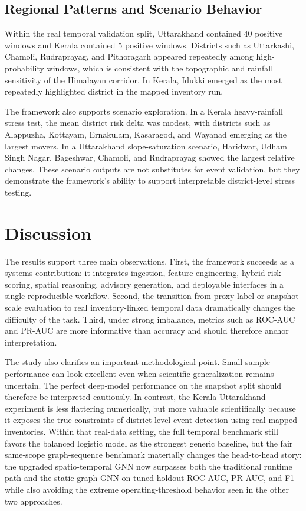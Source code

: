 \documentclass[pdflatex,sn-mathphys-num]{sn-jnl}
\begin{document}
\subsection{Regional Patterns and Scenario Behavior}

Within the real temporal validation split, Uttarakhand contained 40 positive windows and Kerala contained 5 positive windows. Districts such as Uttarkashi, Chamoli, Rudraprayag, and Pithoragarh appeared repeatedly among high-probability windows, which is consistent with the topographic and rainfall sensitivity of the Himalayan corridor. In Kerala, Idukki emerged as the most repeatedly highlighted district in the mapped inventory run.

The framework also supports scenario exploration. In a Kerala heavy-rainfall stress test, the mean district risk delta was modest, with districts such as Alappuzha, Kottayam, Ernakulam, Kasaragod, and Wayanad emerging as the largest movers. In a Uttarakhand slope-saturation scenario, Haridwar, Udham Singh Nagar, Bageshwar, Chamoli, and Rudraprayag showed the largest relative changes. These scenario outputs are not substitutes for event validation, but they demonstrate the framework's ability to support interpretable district-level stress testing.

\section{Discussion}

The results support three main observations. First, the framework succeeds as a systems contribution: it integrates ingestion, feature engineering, hybrid risk scoring, spatial reasoning, advisory generation, and deployable interfaces in a single reproducible workflow. Second, the transition from proxy-label or snapshot-scale evaluation to real inventory-linked temporal data dramatically changes the difficulty of the task. Third, under strong imbalance, metrics such as ROC-AUC and PR-AUC are more informative than accuracy and should therefore anchor interpretation.

The study also clarifies an important methodological point. Small-sample performance can look excellent even when scientific generalization remains uncertain. The perfect deep-model performance on the snapshot split should therefore be interpreted cautiously. In contrast, the Kerala-Uttarakhand experiment is less flattering numerically, but more valuable scientifically because it exposes the true constraints of district-level event detection using real mapped inventories. Within that real-data setting, the full temporal benchmark still favors the balanced logistic model as the strongest generic baseline, but the fair same-scope graph-sequence benchmark materially changes the head-to-head story: the upgraded spatio-temporal GNN now surpasses both the traditional runtime path and the static graph GNN on tuned holdout ROC-AUC, PR-AUC, and F1 while also avoiding the extreme operating-threshold behavior seen in the other two approaches.
\end{document}
